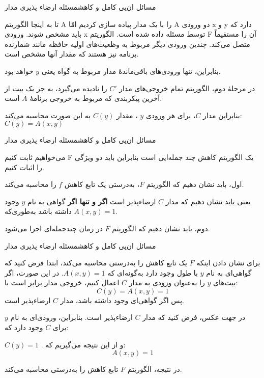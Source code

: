 \begin{itemframe-s}{مسائل ان‌پی کامل و کاهش}{مسئله ارضاء پذیری مدار}
\item[-]
تا به اینجا الگوریتم A را با یک مدار پیاده سازی کردیم امّا A دو ورودی x و y دارد که باید مشخص شوند. ورودی x توسط مسئله داده شده است. الگوریتم F آن را مستقیماً متصل می‌کند. چندین ورودی دیگر مربوط به وظعیت‌های اولیه حافظه مانند شمارنده برنامه نیز هستند که مقدار آنها مشخص است.
\item[-]
بنابراین، تنها ورودی‌های باقی‌ماندهٔ مدار مربوط به گواه یعنی $y$ خواهد بود.
\item[-]
در مرحلهٔ دوم، الگوریتم تمام خروجی‌های مدار $C'$ را نادیده می‌گیرد، به جز یک بیت از آخرین پیکربندی که مربوط به خروجی برنامهٔ $A$ است.
\item[-]
بنابراین مدار $C$، برای هر ورودی $y$ ، مقدار $C(y)$ به این صورت محاسبه می‌کند:
$C(y) = A(x, y)$
\end{itemframe-s}


\begin{itemframe-s}{مسائل ان‌پی کامل و کاهش}{مسئله ارضاء پذیری مدار}
\item[-]
می‌خواهیم ثابت کنیم F یک الگوریتم کاهش چند جمله‌ایی است بنابراین باید دو ویژگی را اثبات کنیم.

\item[-]
اول، باید نشان دهیم که الگوریتم $F$، به‌درستی یک تابع کاهش $f$ را محاسبه می‌کند.

یعنی باید نشان دهیم که مدار $C$ ارضاء‌پذیر است \textbf{اگر و تنها اگر} گواهی به نام $y$ وجود داشته باشد به‌طوری‌که
$A(x, y) = 1$.
\item[-]
دوم، باید نشان دهیم که الگوریتم $F$ در زمان چندجمله‌ای اجرا می‌شود.
\end{itemframe-s}


\begin{itemframe-s}{مسائل ان‌پی کامل و کاهش}{مسئله ارضاء پذیری مدار}
\item[-]
برای نشان دادن اینکه $F$ یک تابع کاهش را به‌درستی محاسبه می‌کند، ابتدا فرض کنید که گواهی‌ای به نام $y$ با طول وجود دارد به‌گونه‌ای که
$A(x, y) = 1$.
در این صورت، اگر بیت‌های $y$ را به‌عنوان ورودی به مدار $C$ اعمال کنیم، خروجی مدار برابر است با:
$$
C(y) = A(x, y) = 1
$$
پس اگر گواهی‌ای وجود داشته باشد، مدار $C$ ارضاء‌پذیر است.
\item[-]
در جهت عکس، فرض کنید که مدار $C$ ارضاءپذیر است. بنابراین، ورودی‌ای به نام $y$ برای $C$ وجود دارد که:

$C(y)=1$ .
و از این نتیجه می‌گیریم که:
$$A(x,y)=1$$
\item[-]
در نتیجه، الگوریتم $F$ تابع کاهش را به‌درستی محاسبه می‌کند.
\end{itemframe-s}


